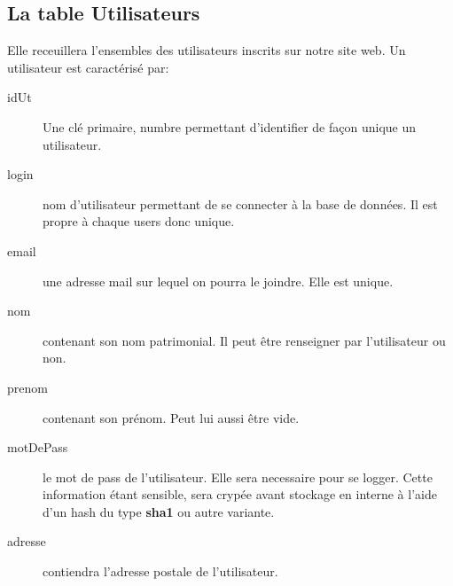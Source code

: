 \subsection{La table Utilisateurs}
Elle receuillera l'ensembles des utilisateurs inscrits sur notre site web.
Un utilisateur est caractérisé par:
\begin{description}
    \item[idUt] Une clé primaire, numbre permettant d'identifier de façon unique un utilisateur.
    \item[login] nom d'utilisateur permettant de se connecter à la base de données. Il est propre à chaque users donc unique.
    \item[email] une adresse mail sur lequel on pourra le joindre. Elle est unique.
    \item[nom] contenant son nom patrimonial. Il peut être renseigner par l'utilisateur ou non.
    \item[prenom] contenant son prénom. Peut lui aussi être vide.
    \item[motDePass] le mot de pass de l'utilisateur. Elle sera necessaire pour se logger. Cette information étant sensible, sera crypée avant stockage en interne à l'aide d'un hash du type \textbf{sha1} ou autre variante.
    \item[adresse] contiendra l'adresse postale de l'utilisateur.
\end{description}


